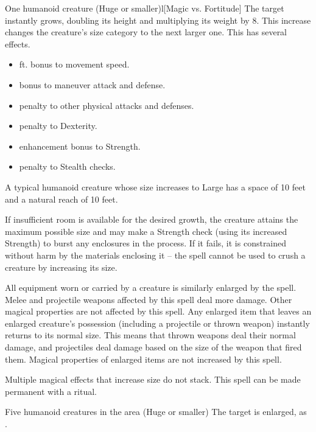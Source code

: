 \spellrng{\rngclose}
\spelldur{\durshort \dismissable}
\begin{spelltarget}{One humanoid creature (Huge or smaller)}l[Magic vs. Fortitude]
    \spelleffect The target instantly grows, doubling its height and multiplying its weight by 8. This increase changes the creature's size category to the next larger one. This has several effects.
    \begin{itemize} 
        \item {} ft. bonus to movement speed.
        \item {} bonus to maneuver attack and defense.
        \item {} penalty to other physical attacks and defenses.
        \item {} penalty to Dexterity.
        \item {} enhancement bonus to Strength.
        \item {} penalty to Stealth checks.
    \end{itemize}
    \par A typical humanoid creature whose size increases to Large has a space of 10 feet and a natural reach of 10 feet.
    \par If insufficient room is available for the desired growth, the creature attains the maximum possible size and may make a Strength check (using its increased Strength) to burst any enclosures in the process. If it fails, it is constrained without harm by the materials enclosing it -- the spell cannot be used to crush a creature by increasing its size.
    \par All equipment worn or carried by a creature is similarly enlarged by the spell. Melee and projectile weapons affected by this spell deal more damage. Other magical properties are not affected by this spell. Any enlarged item that leaves an enlarged creature's possession (including a projectile or thrown weapon) instantly returns to its normal size. This means that thrown weapons deal their normal damage, and projectiles deal damage based on the size of the weapon that fired them. Magical properties of enlarged items are not increased by this spell.
\end{spelltarget}
\spellnotes Multiple magical effects that increase size do not stack. This spell can be made permanent with a  ritual.

\spelldur{\durshort \dismissable}
\begin{spelltarget}{Five humanoid creatures in the area (Huge or smaller)}
    \spelleffect The target is enlarged, as .
\end{spelltarget}

